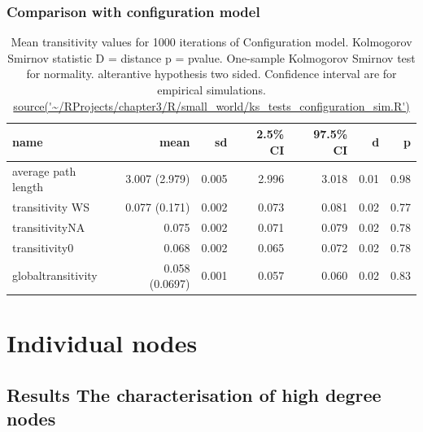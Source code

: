 \subsubsection{Comparison with configuration model}
\begin{table}[ht]
\centering
\begin{tabular}{lrrrrrr}
  \hline
name & mean & sd & 2.5\% CI & 97.5\% CI & d & p \\ 
  \hline
average path length & 3.007 (2.979) & 0.005 & 2.996 & 3.018 & 0.01 & 0.98 \\ 
  transitivity WS & 0.077 (0.171) & 0.002 & 0.073 & 0.081 & 0.02 & 0.77 \\ 
  transitivityNA & 0.075 & 0.002 & 0.071 & 0.079 & 0.02 & 0.78 \\ 
  transitivity0 & 0.068 & 0.002 & 0.065 & 0.072 & 0.02 & 0.78 \\ 
  globaltransitivity & 0.058 (0.0697) & 0.001 & 0.057 & 0.060 & 0.02 & 0.83 \\ 
   \hline
\end{tabular}
\caption{Mean transitivity values for 1000 iterations of Configuration  model. Kolmogorov Smirnov statistic D = distance p = pvalue. One-sample Kolmogorov Smirnov test for normality. alterantive hypothesis two sided. Confidence interval are for empirical simulations. \url{source('~/RProjects/chapter3/R/small_world/ks_tests_configuration_sim.R')} } 
\label{tab:Mean transitivity values for 1000 iterations of Configuration model.}
\end{table}





\section{Individual nodes}
\subsection{Results The characterisation of high degree nodes}
\label{sec:  results characterisation of high degree nodes}

